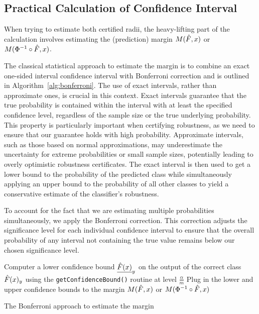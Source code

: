 \subsection{Practical Calculation of Confidence Interval}\label{subsec:practical-calculation-of-confidence-interval}

When trying to estimate both certified radii, the heavy-lifting part of the calculation involves estimating the (prediction) margin $M(\Hat{F},x)$ or $M(\Phi^{-1}\circ\Hat{F},x)$.

The classical statistical approach to estimate the margin is to combine an exact one-sided interval confidence interval with Bonferroni correction and is outlined in Algorithm~\ref{alg:bonferroni}.
The use of exact intervals, rather than approximate ones, is crucial in this context.
Exact intervals guarantee that the true probability is contained within the interval with at least the specified confidence level, regardless of the sample size or the true underlying probability.
This property is particularly important when certifying robustness, as we need to ensure that our guarantee holds with high probability.
Approximate intervals, such as those based on normal approximations, may underestimate the uncertainty for extreme probabilities or small sample sizes, potentially leading to overly optimistic robustness certificates.
The exact interval is then used to get a lower bound to the probability of the predicted class while simultaneously applying an upper bound to the probability of all other classes to yield a conservative estimate of the classifier's robustness.

To account for the fact that we are estimating multiple probabilities simultaneously, we apply the Bonferroni correction.
This correction adjusts the significance level for each individual confidence interval to ensure that the overall probability of any interval not containing the true value remains below our chosen significance level.

\begin{algorithm}[htbp]
    \DontPrintSemicolon %

    Computer a lower confidence bound $\underline{\Hat{F}(x)}_{y}$ on the output of the correct class $\Hat{F}(x)_{y}$ using the \texttt{getConfidenceBound()} routine at level $\frac{\alpha}{m}$\;
    Plug in the lower and upper confidence bounds to the margin $M(\Hat{F},x)$ or $M(\Phi^{-1}\circ\Hat{F},x)$\;
    \caption{The Bonferroni approach to estimate the margin}\label{alg:bonferroni}
\end{algorithm}

